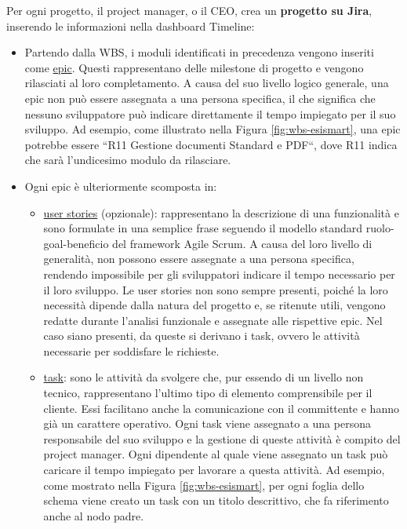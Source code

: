         Per ogni progetto, il project manager, o il CEO, crea un \textbf{progetto su Jira}, inserendo le informazioni nella dashboard Timeline:
        \begin{itemize}
            \item Partendo dalla \ac{WBS}, i moduli identificati in precedenza vengono inseriti come \underline{epic}. Questi rappresentano
            delle milestone di progetto e vengono rilasciati al loro completamento. A causa del suo livello logico generale, una epic non può essere
            assegnata a una persona specifica, il che significa che nessuno sviluppatore può indicare direttamente il tempo impiegato per il suo sviluppo. Ad
            esempio, come illustrato nella Figura \ref{fig:wbs-esismart}, una epic potrebbe essere “R11 Gestione documenti Standard e PDF“, dove R11 indica che sarà l’undicesimo modulo da rilasciare.

            \item Ogni epic è ulteriormente scomposta in:
                \begin{itemize}
                    \item \underline{user stories} (opzionale): rappresentano la descrizione di una funzionalità e sono formulate in una semplice frase seguendo
                    il modello standard ruolo-goal-beneficio del framework Agile Scrum. A causa del loro livello di generalità, non possono essere
                    assegnate a una persona specifica, rendendo impossibile per gli sviluppatori indicare il tempo necessario per il loro sviluppo. Le
                    user stories non sono sempre presenti, poiché la loro necessità dipende dalla natura del progetto e, se ritenute utili, vengono
                    redatte durante l’analisi funzionale e assegnate alle rispettive epic. Nel caso siano presenti, da queste si derivano i task, ovvero le
                    attività necessarie per soddisfare le richieste.

                    \item \underline{task}: sono le attività da svolgere che, pur essendo di un livello non tecnico, rappresentano l'ultimo tipo di elemento
                    comprensibile per il cliente. Essi facilitano anche la comunicazione con il committente e hanno già un carattere operativo. Ogni task
                    viene assegnato a una persona responsabile del suo sviluppo e la gestione di queste attività è compito del project manager. Ogni
                    dipendente al quale viene assegnato un task può caricare il tempo impiegato per lavorare a questa attività. Ad esempio, come mostrato
                    nella Figura \ref{fig:wbs-esismart}, per ogni foglia dello schema viene creato un task con un titolo descrittivo, che fa riferimento anche al nodo padre.
                \end{itemize}
            

\end{itemize}
